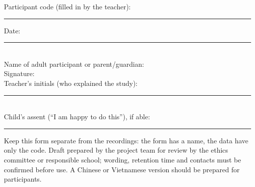 \documentclass[11pt,a4paper]{article}
\begin{document}
\vspace{6pt}
\newcommand{\line}[2]{\noindent #1 \hrulefill\hspace{1em}#2 \rule{4cm}{0.4pt}\\[12pt]}
\noindent Participant code (filled in by the teacher): \rule{3.5cm}{0.4pt}\hfill Date: \rule{4cm}{0.4pt}\\[12pt]
\noindent Name of adult participant or parent/guardian: \hrulefill\\[12pt]
\noindent Signature: \hrulefill\\[12pt]
\noindent Teacher's initials (who explained the study): \rule{3cm}{0.4pt}\\[12pt]
\noindent Child's assent (``I am happy to do this''), if able: \rule{4cm}{0.4pt}

\vspace{4pt}\footnotesize Keep this form separate from the recordings: the form has a name, the data have only the code. Draft prepared by the project team for review by the ethics committee or responsible school; wording, retention time and contacts must be confirmed before use. A Chinese or Vietnamese version should be prepared for participants.
\end{document}
